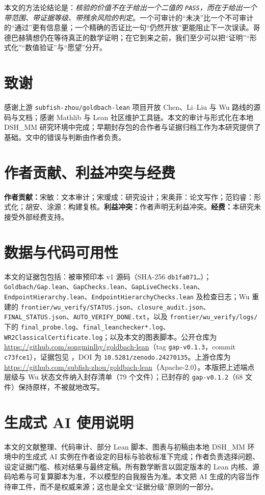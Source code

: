 \documentclass[11pt,a4paper]{ctexart}
\theoremstyle{plain}
\theoremstyle{definition}
\begin{document}
本文的方法论结论是：\emph{核验的价值不在于给出一个二值的 \texttt{PASS}，而在于给出一个带范围、带证据等级、带残余风险的判定}。一个可审计的“未决”比一个不可审计的“通过”更有信息量；一个精确的否证比一句“仍然开放”更能阻止下一次误读。哥德巴赫猜想仍在等待真正的数学证明；在它到来之前，我们至少可以把“证明”“形式化”“数值验证”与“愿望”分开。

\section*{致谢}
感谢上游 \texttt{subfish-zhou/goldbach-lean} 项目开放 Chen、Li--Liu 与 Wu 路线的源码与文档；感谢 Mathlib 与 Lean 社区维护工具链。本文的审计与形式化在本地 DSH\_MM 研究环境中完成；早期封存包的合作者与证据归档工作为本研究提供了基础。文中的错误与判断由作者负责。

\section*{作者贡献、利益冲突与经费}
\textbf{作者贡献：}宋敏：文本审计；宋瑷成：研究设计；宋奥菲：论文写作；范钧睿：形式化；胡安、涂源：构建复核。\textbf{利益冲突：}作者声明无利益冲突。\textbf{经费：}本研究未接受外部经费支持。

\section*{数据与代码可用性}
{\raggedright
本文的证据包包括：被审预印本 v1 源码（SHA-256 \texttt{db1fa071\ldots}）；\texttt{Goldbach/Gap.lean}、\texttt{GapChecks.lean}、\texttt{GapLiveChecks.lean}、\texttt{EndpointHierarchy.lean}、\texttt{EndpointHierarchyChecks.lean} 及检查日志；Wu 重建的 \texttt{frontier/wu\_verify/STATUS.json}、\texttt{closure\_audit.json}、\texttt{FINAL\_STATUS.json}、\texttt{AUTO\_VERIFY\_DONE.txt}，以及 \texttt{frontier/wu\_verify/logs/} 下的 \texttt{final\_probe.log}、\texttt{final\_leanchecker*.log}、\texttt{WR2ClassicalCertificate.log}；以及本文的图表脚本。公开仓库为 \url{https://github.com/songminlhy/goldbach-lean}（tag \texttt{gap-v0.1.3}，commit \texttt{c73fce1}），证据包见 \cite{evidence}，DOI 为 \texttt{10.5281/zenodo.24270135}。上游仓库为 \url{https://github.com/subfish-zhou/goldbach-lean}（Apache-2.0）。本版把上述端点层级与 Wu 状态文件纳入封存清单（79 个文件）；已封存的 \texttt{gap-v0.1.2}（68 文件）保持原样，不被就地改写。
\par}

\section*{生成式 AI 使用说明}
本文的文献整理、代码审计、部分 Lean 脚本、图表与初稿由本地 DSH\_MM 环境中的生成式 AI 实例在作者设定的目标与验收标准下完成；作者负责选择问题、设定证据门槛、核对结果与最终定稿。所有数学断言以固定版本的 Lean 内核、源码哈希与可复算脚本为准，不以模型的自我报告为准。本文把 AI 生成的内容当作待审工件，而不是权威来源；这也是全文“证据分级”原则的一部分。
\end{document}
